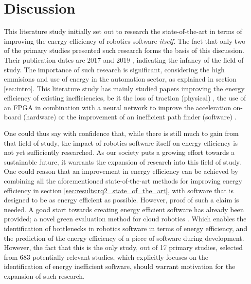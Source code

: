 \section{Discussion}
\label{sec:discussion}
This literature study initially set out to research the state-of-the-art in terms of improving the
energy efficiency of robotics software \textit{itself}.
The fact that only two of the primary studies presented such research forms the basis of this discussion.
Their publication dates are 2017 \cite{hou2017novel_cloud_evaluation_model} and 2019 \cite{rahman2019cloud_robot_offloading}, 
indicating the infancy of the field of study. The importance of such research is significant, 
considering the high emmisions and use of energy in the automation sector, as explained in section \ref{sec:intro}.
This literature study has mainly studied papers improving the energy efficiency of existing inefficiencies, 
be it the loss of traction (physical) \cite{kim2016firefighting_robot}, 
the use of an FPGA in combination with a neural network
to improve the acceleration on-board (hardware) \cite{cheng2018FPGA_image_recognition} 
or the improvement of an inefficient path finder (software) \cite{mei2006mobile_exploration}.

One could thus say with confidence that, while there is still much to gain from that field of study,
the impact of robotics software itself on energy efficiency is not yet sufficiently researched.
As our society puts a growing effort towards a sustainable future, it warrants the expansion of research into this field of study.
One could reason that an improvement in energy efficiency can be achieved by combining all the aforementioned state-of-the-art methods for improving 
energy efficiency in section \ref{sec:results:rq2_state_of_the_art}, with software that is designed to be as energy efficient as possible.
However, proof of such a claim is needed.
A good start towards creating energy efficient software has already been provided; 
a novel green evaluation method for cloud robotics \cite{hou2017novel_cloud_evaluation_model}.
Which enables the identification of bottlenecks in robotics software in terms of energy efficiency, 
and the prediction of the energy efficiency of a piece of software during development.
However, the fact that this is the only study, out of 17 primary studies, selected from 683 potentially relevant studies, 
which explicitly focuses on the identification of energy inefficient software, should warrant motivation for
the expansion of such research.